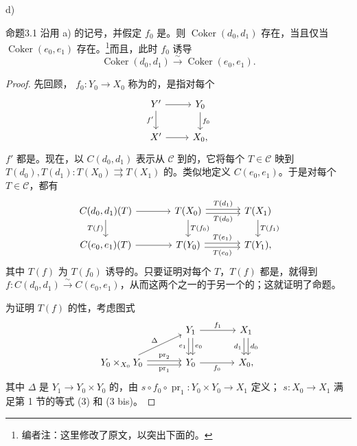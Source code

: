 d) \begin{SGAresult}{命题}{3.1}
沿用 a) 的记号，并假定 $f_0$ 是。则 $\operatorname{Coker}(d_0,d_1)$ 存在，当且仅当 $\operatorname{Coker}(e_0,e_1)$ 存在。\footnote{编者注：这里修改了原文，以突出下面的。}而且，此时 $f_0$ 诱导
\[\operatorname{Coker}(d_0,d_1)\xrightarrow{\sim}\operatorname{Coker}(e_0,e_1).\]
\end{SGAresult}
\begin{proof}
先回顾， $f_0:Y_0\to X_0$ 称为的，是指对每个
\[
\begin{tikzcd}
Y'\arrow[r]\arrow[d,"f'"']&Y_0\arrow[d,"f_0"]\\
X'\arrow[r]&X_0,
\end{tikzcd}
\]
$f'$ 都是。现在，以 $C(d_0,d_1)$ 表示从 $\mathcal C$ 到的，它将每个 $T\in\mathcal C$ 映到 $T(d_0),T(d_1):T(X_0)\rightrightarrows T(X_1)$ 的。类似地定义 $C(e_0,e_1)$。于是对每个 $T\in\mathcal C$，都有
\[
\begin{tikzcd}[column sep=large]
C(d_0,d_1)(T)\arrow[r]\arrow[d,"T(f)"']&T(X_0)\arrow[r,shift left=.5ex,"T(d_1)"]\arrow[r,shift right=.5ex,"T(d_0)"']\arrow[d,"T(f_0)"]&T(X_1)\arrow[d,"T(f_1)"]\\
C(e_0,e_1)(T)\arrow[r]&T(Y_0)\arrow[r,shift left=.5ex,"T(e_1)"]\arrow[r,shift right=.5ex,"T(e_0)"']&T(Y_1),
\end{tikzcd}
\]
其中 $T(f)$ 为 $T(f_0)$ 诱导的。只要证明对每个 $T$，$T(f)$ 都是，就得到 $f:C(d_0,d_1)\xrightarrow{\sim}C(e_0,e_1)$，从而这两个之一的于另一个的；这就证明了命题。

为证明 $T(f)$ 的性，考虑图式
\[
\begin{tikzcd}[column sep=large]
&Y_1\arrow[r,"f_1"]\arrow[d,shift left=.5ex,"e_0"]\arrow[d,shift right=.5ex,"e_1"']&X_1\arrow[d,shift left=.5ex,"d_0"]\arrow[d,shift right=.5ex,"d_1"']\\
Y_0\times_{X_0}Y_0\arrow[ur,"\Delta"]\arrow[r,shift left=.5ex,"\operatorname{pr}_2"]\arrow[r,shift right=.5ex,"\operatorname{pr}_1"']&Y_0\arrow[r,"f_0"']&X_0,
\end{tikzcd}
\]
其中 $\Delta$ 是 $Y_1\to Y_0\times Y_0$ 的，由 $s\circ f_0\circ\operatorname{pr}_1:Y_0\times Y_0\to X_1$ 定义； $s:X_0\to X_1$ 满足第 1 节的等式 (3) 和 (3 bis)。


\end{proof}
